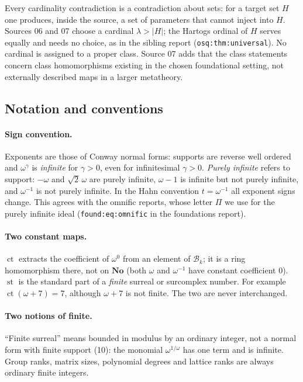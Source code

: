 \documentclass[11pt,oneside]{article}
\numberwithin{equation}{section}
\theoremstyle{definition}
\theoremstyle{remark}
\newcommand{\No}{\mathbf{No}}
\newcommand{\Bk}{\mathcal B_k}
\newcommand{\ct}{\operatorname{ct}}
\newcommand{\st}{\operatorname{st}}
\newcommand{\replabel}[1]{\nolinkurl{#1}}
\begin{document}
Every cardinality contradiction is a contradiction about sets: for a target
set $H$ one produces, inside the source, a set of parameters that cannot inject
into $H$. Sources 06 and 07 choose a cardinal $\lambda>|H|$; the Hartogs ordinal
of $H$ serves equally and needs no choice, as in the sibling report
(\replabel{osq:thm:universal}). No cardinal is assigned to a proper class.
Source 07 adds that the class statements concern class homomorphisms existing
in the chosen foundational setting, not externally described maps in a larger
metatheory.

\subsection{Notation and conventions}\label{ogl:sub:notation}

\paragraph{Sign convention.} Exponents are those of Conway normal forms:
supports are reverse well ordered and $\omega^\gamma$ is \emph{infinite} for
$\gamma>0$, even for infinitesimal $\gamma>0$. \emph{Purely infinite} refers to
support: $-\omega$ and $\sqrt2\,\omega$ are purely infinite, $\omega-1$ is
infinite but not purely infinite, and $\omega^{-1}$ is not purely infinite. In
the Hahn convention $t=\omega^{-1}$ all exponent signs change. This agrees with
the omnific reports, whose letter $\Pi$ we use for the purely infinite ideal
(\replabel{found:eq:omnific} in the foundations report).

\paragraph{Two constant maps.} $\ct$ extracts the coefficient of $\omega^0$
from an element of $\Bk$; it is a ring homomorphism there, not on $\No$
(both $\omega$ and $\omega^{-1}$ have constant coefficient $0$). $\st$ is the
standard part of a \emph{finite} surreal or surcomplex number. For example
$\ct(\omega+7)=7$, although $\omega+7$ is not finite. The two are never
interchanged.

\paragraph{Two notions of finite.} ``Finite surreal'' means bounded in modulus
by an ordinary integer, not a normal form with finite support (10): the
monomial $\omega^{1/\omega}$ has one term and is infinite. Group ranks, matrix
sizes, polynomial degrees and lattice ranks are always ordinary finite
integers.
\end{document}
